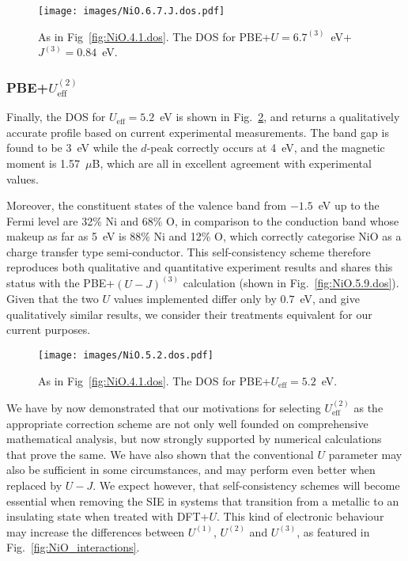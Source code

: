 \begin{figure}[th!]
\centering
\texttt{[image: images/NiO.6.7.J.dos.pdf]}
\caption[NiO DOS with $U=6.7$~eV and $J=0.84$~eV]
{As in Fig~\ref{fig:NiO.4.1.dos}. 
The DOS for PBE+$U=6.7^{(3)}$~eV+$J^{(3)}=0.84$~eV.}
\label{fig:NiO.6.7.J.dos}
\end{figure}


\subsubsection{PBE+$U_\textrm{eff}^{(2)}$}
Finally, the DOS for $U_\textrm{eff}=5.2$~eV is shown in 
Fig.~\ref{fig:NiO.5.2.dos}, 
and returns a qualitatively accurate profile 
based on current experimental measurements.
%
The band gap is found to be 3~eV 
while the $d$-peak correctly occurs at 4~eV, 
and the magnetic moment is 1.57~$\mu$B, 
which are all in excellent agreement 
with experimental values.

Moreover, 
the constituent states of the 
valence band from $-1.5$~eV 
up to the Fermi level are 
32\% Ni and 68\% O, 
in comparison to the conduction band
whose makeup as far as 5~eV 
is 88\% Ni and 12\% O, 
which correctly categorise NiO 
as a charge transfer type semi-conductor.
%
This self-consistency scheme therefore reproduces 
both qualitative and quantitative experiment results 
and shares this status with 
the PBE+$(U-J)^{(3)}$ calculation 
(shown in Fig.~\ref{fig:NiO.5.9.dos}). 
%
Given that the two $U$ values implemented 
differ only by $0.7$~eV, 
and give qualitatively similar results, 
we consider their treatments equivalent 
for our current purposes.

\begin{figure}[th!]
\centering
\texttt{[image: images/NiO.5.2.dos.pdf]}
\caption[NiO DOS with $U_\textrm{eff}=5.2$~eV]
{As in Fig~\ref{fig:NiO.4.1.dos}. 
The DOS for PBE+$U_\textrm{eff}=5.2$~eV.}
\label{fig:NiO.5.2.dos}
\end{figure}


We have by now demonstrated that 
our motivations for selecting $U_\textrm{eff}^{(2)}$ 
as the appropriate correction scheme are not only well 
founded on comprehensive mathematical analysis, 
but now strongly supported by numerical calculations 
that prove the same.
%
We have also shown that the conventional 
$U$ parameter may also be 
sufficient in some circumstances, 
and may perform even better when replaced by $U-J$.
%
We expect however, 
that self-consistency schemes will become essential 
when removing the SIE in systems that transition 
from a metallic to an insulating state 
when treated with DFT+$U$.
%
This kind of electronic behaviour 
may increase the differences between 
$U^{(1)}$, $U^{(2)}$ and $U^{(3)}$, 
as featured in Fig.~\ref{fig:NiO_interactions}.

